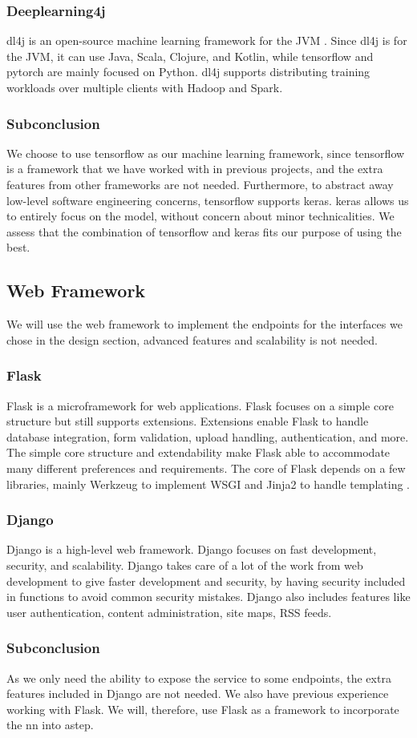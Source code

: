 \subsubsection*{Deeplearning4j}
\gls{dl4j} is an open-source machine learning framework for the JVM \cite{dl4j}. Since \gls{dl4j} is for the JVM, it can use Java, Scala, Clojure, and Kotlin, while \gls{tensorflow} and \gls{pytorch} are mainly focused on Python. \gls{dl4j} supports distributing training workloads over multiple clients with Hadoop and Spark.

\subsubsection*{Subconclusion}
We choose to use \gls{tensorflow} as our machine learning framework, since \gls{tensorflow} is a framework that we have worked with in previous projects, and the extra features from other frameworks are not needed. Furthermore, to abstract away low-level software engineering concerns, \gls{tensorflow} supports \gls{keras}. \gls{keras} allows us to entirely focus on the model, without concern about minor technicalities. We assess that the combination of \gls{tensorflow} and \gls{keras} fits our purpose of using the best.

\subsection{Web Framework}
We will use the web framework to implement the \glspl{endpoint} for the interfaces we chose in the design section, advanced features and scalability is not needed.
\subsubsection*{Flask}
Flask is a microframework for web applications. Flask focuses on a simple core structure but still supports extensions. Extensions enable Flask to handle database integration, form validation, upload handling,  authentication, and more. The simple core structure and extendability make Flask able to accommodate many different preferences and requirements. The core of Flask depends on a few libraries, mainly Werkzeug to implement WSGI and Jinja2 to handle templating \cite{DesignFlask, DependenciesFlask}.

\subsubsection*{Django}
Django is a high-level web framework. Django focuses on fast development, security, and scalability. Django takes care of a lot of the work from web development to give faster development and security, by having security included in functions to avoid common security mistakes. Django also includes features like user authentication, content administration, site maps, RSS feeds.

\subsubsection*{Subconclusion}
As we only need the ability to expose the service to some endpoints, the extra features included in Django are not needed. We also have previous experience working with Flask. We will, therefore, use Flask as a framework to incorporate the \gls{nn} into \gls{astep}.
